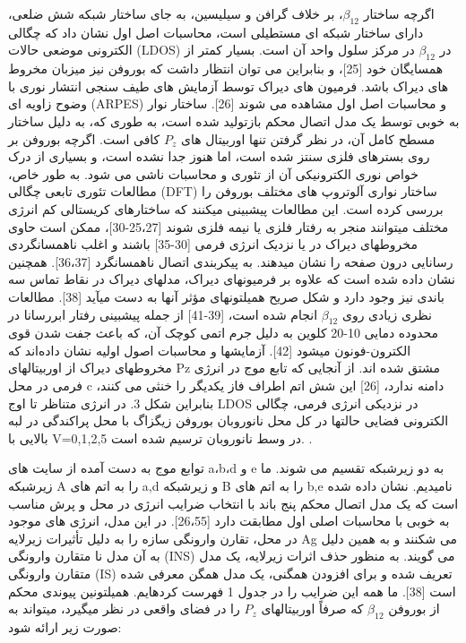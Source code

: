 اگرچه ساختار $\beta_{12}$، بر خلاف گرافن و سیلیسین، به جای ساختار شبکه شش ضلعی، دارای ساختار شبکه ای مستطیلی است، محاسبات اصل اول نشان داد که چگالی الکترونی موضعی حالات (LDOS) در $\beta_{12}$ در مرکز سلول واحد آن است. بسیار کمتر از همسایگان خود [25]، و بنابراین می توان انتظار داشت که بوروفن نیز میزبان مخروط های دیراک باشد. فرمیون های دیراک توسط آزمایش های طیف سنجی انتشار نوری با وضوح زاویه ای (ARPES) و محاسبات اصل اول مشاهده می شوند [26]. ساختار نوار به خوبی توسط یک مدل اتصال محکم بازتولید شده است، به طوری که، به دلیل ساختار مسطح کامل آن، در نظر گرفتن تنها اوربیتال های $P_z$ کافی است. اگرچه بوروفن بر روی بسترهای فلزی سنتز شده است، اما هنوز جدا نشده است، و بسیاری از درک خواص نوری الکترونیکی آن از تئوری و محاسبات ناشی می شود. به طور خاص، مطالعات تئوری تابعی چگالی (DFT) ساختار نواری آلوتروپ های مختلف بوروفن را بررسی کرده است. این مطالعات پیشبینی میکنند که ساختارهای کریستالی کم انرژی مختلف میتوانند منجر به رفتار فلزی یا نیمه فلزی شوند [25،27-30]، ممکن است حاوی مخروطهای دیراک در یا نزدیک انرژی فرمی [30-35] باشند و اغلب ناهمسانگردی رسانایی درون صفحه را نشان میدهند. به پیکربندی اتصال ناهمسانگرد [36،37]. همچنین نشان داده شده است که علاوه بر فرمیونهای دیراک، مدلهای دیراک در نقاط تماس سه باندی نیز وجود دارد و شکل صریح همیلتونهای مؤثر آنها به دست میآید [38]. مطالعات نظری زیادی روی $\beta_{12}$ انجام شده است، [39-41] از جمله پیشبینی رفتار ابررسانا در محدوده دمایی 10-20 کلوین به دلیل جرم اتمی کوچک آن، که باعث جفت شدن قوی الکترون-فونون میشود [42].
آزمایشها و محاسبات اصول اولیه نشان داده‌اند که مخروطهای دیراک از اوربیتالهای Pz مشتق شده اند. از آنجایی که تابع موج در انرژی فرمی در محل c دامنه ندارد، [26] این شش اتم اطراف فاز یکدیگر را خنثی می کنند، بنابراین شکل 3. در انرژی متناظر تا اوج LDOS در نزدیکی انرژی فرمی، چگالی الکترونی فضایی حالتها در کل محل نانوروبان بوروفن زیگزاگ با محل پراکندگی در لبه بالایی با V=0,1,2,5 در وسط نانوروبان ترسیم شده است. . 

توابع موج به دست آمده از سایت های a،b،d و e به دو زیرشبکه تقسیم می شوند. ما زیرشبکه A را به اتم های a,d و زیرشبکه B را به اتم های b,e نامیدیم. نشان داده شده است که یک مدل اتصال محکم پنج باند با انتخاب ضرایب انرژی در محل و پرش مناسب به خوبی با محاسبات اصلی اول مطابقت دارد [26،55]. در این مدل، انرژی های موجود در محل، تقارن وارونگی سازه را به دلیل تأثیرات زیرلایه Ag می شکنند و به همین دلیل به آن مدل نا متقارن وارونگی (INS) می گویند. به منظور حذف اثرات زیرلایه، یک مدل متقارن وارونگی (IS) تعریف شده و برای افزودن همگنی، یک مدل همگن معرفی شده است [38]. ما همه این ضرایب را در جدول 1 فهرست کردهایم. همیلتونین پیوندی محکم از بوروفن $\beta_{12}$ که صرفاً اوربیتالهای $P_z$ را در فضای واقعی در نظر میگیرد، میتواند به صورت زیر ارائه شود:

